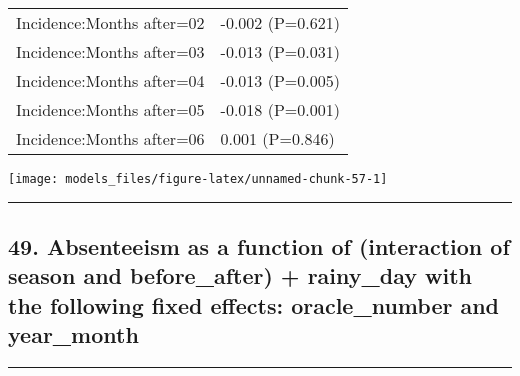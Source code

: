\documentclass[]{article}
\begin{document}
\begin{longtable}[t]{ll}
\hspace{1em}Incidence:Months after=02 & -0.002 (P=0.621)\\
\hspace{1em}Incidence:Months after=03 & -0.013 (P=0.031)\\
\hspace{1em}Incidence:Months after=04 & -0.013 (P=0.005)\\
\hspace{1em}Incidence:Months after=05 & -0.018 (P=0.001)\\
\hspace{1em}Incidence:Months after=06 & 0.001 (P=0.846)\\*
\end{longtable}

\begin{center}\texttt{[image: models\_files/figure-latex/unnamed-chunk-57-1]} \end{center}

\newpage

\begin{center}\rule{0.5\linewidth}{\linethickness}\end{center}

\subsection{49. Absenteeism as a function of (interaction of season and
before\_after) + rainy\_day with the following fixed effects:
oracle\_number and
year\_month}\label{absenteeism-as-a-function-of-interaction-of-season-and-before_after-rainy_day-with-the-following-fixed-effects-oracle_number-and-year_month}

\begin{center}\rule{0.5\linewidth}{\linethickness}\end{center}
\end{document}
